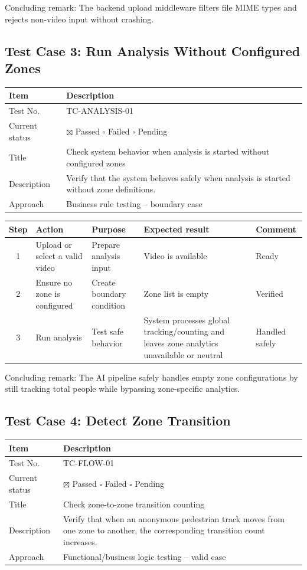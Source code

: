 \documentclass[12pt,a4paper]{report}
\begin{document}
Concluding remark: The backend upload middleware filters file MIME types and rejects non-video input without crashing.

\subsection{Test Case 3: Run Analysis Without Configured Zones}
\begin{longtable}{|p{4cm}|p{10cm}|}
\hline
\rowcolor{HeaderBlue}\textbf{Item} & \textbf{Description} \\
\hline
Test No. & TC-ANALYSIS-01 \\
\hline
Current status & $\boxtimes$ Passed \quad $\square$ Failed \quad $\square$ Pending \\
\hline
Title & Check system behavior when analysis is started without configured zones \\
\hline
Description & Verify that the system behaves safely when analysis is started without zone definitions. \\
\hline
Approach & Business rule testing -- boundary case \\
\hline
\end{longtable}

\begin{longtable}{|c|p{3.5cm}|p{3.2cm}|p{4.2cm}|p{2cm}|}
\hline
\rowcolor{HeaderBlue}
\textbf{Step} & \textbf{Action} & \textbf{Purpose} & \textbf{Expected result} & \textbf{Comment} \\
\hline
1 & Upload or select a valid video & Prepare analysis input & Video is available & Ready \\
\hline
2 & Ensure no zone is configured & Create boundary condition & Zone list is empty & Verified \\
\hline
3 & Run analysis & Test safe behavior & System processes global tracking/counting and leaves zone analytics unavailable or neutral & Handled safely \\
\hline
\end{longtable}

Concluding remark: The AI pipeline safely handles empty zone configurations by still tracking total people while bypassing zone-specific analytics.

\subsection{Test Case 4: Detect Zone Transition}
\begin{longtable}{|p{4cm}|p{10cm}|}
\hline
\rowcolor{HeaderBlue}\textbf{Item} & \textbf{Description} \\
\hline
Test No. & TC-FLOW-01 \\
\hline
Current status & $\boxtimes$ Passed \quad $\square$ Failed \quad $\square$ Pending \\
\hline
Title & Check zone-to-zone transition counting \\
\hline
Description & Verify that when an anonymous pedestrian track moves from one zone to another, the corresponding transition count increases. \\
\hline
Approach & Functional/business logic testing -- valid case \\
\hline
\end{longtable}
\end{document}
